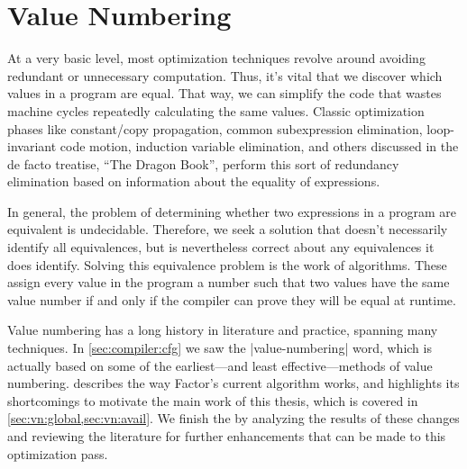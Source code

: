 \section{Value Numbering}\label{sec:vn}

At a very basic level, most optimization techniques revolve around avoiding
redundant or unnecessary computation.  Thus, it's vital that we discover which
values in a program are equal.  That way, we can simplify the code that wastes
machine cycles repeatedly calculating the same values.  Classic optimization
phases like constant/copy propagation, common subexpression elimination,
loop-invariant code motion, induction variable elimination, and others
discussed in the de facto treatise, ``The Dragon Book'', perform
this sort of redundancy elimination based on information about the equality of
expressions.

In general, the problem of determining whether two expressions in a program are
equivalent is undecidable.  Therefore, we seek a  solution
that doesn't necessarily identify all equivalences, but is nevertheless correct
about any equivalences it does identify.  Solving this equivalence problem is
the work of  algorithms.  These assign every value in the
program a number such that two values have the same value number if and only if
the compiler can prove they will be equal at runtime.

Value numbering has a long history in literature and practice, spanning many
techniques.  In \cref{sec:compiler:cfg} we saw the \factor|value-numbering|
word, which is actually based on some of the earliest---and least
effective---methods of value numbering.   describes the way
Factor's current algorithm works, and highlights its shortcomings to motivate
the main work of this thesis, which is covered in
\cref{sec:vn:global,sec:vn:avail}.  We finish the  by
analyzing the results of these changes and reviewing the literature for further
enhancements that can be made to this optimization pass.

%
%

%
%
